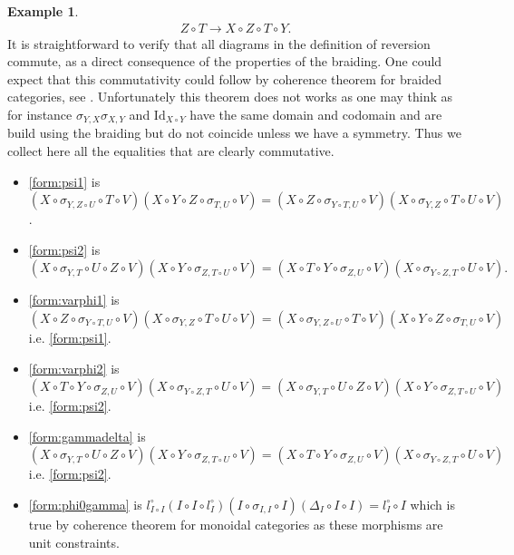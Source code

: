 \documentclass[nosumlimits,twoside]{amsart}
\theoremstyle{definition}
\newtheorem{example}[example]{\sc Example}
\theoremstyle{remark}
\newenvironment{invisible}{{\noindent\sc \colorbox{yellow}{Invisible:}\;}\color{gray}}{\medskip}
\newcommand{\id}{\mathrm{Id}}
\begin{document}
\begin{example}
\begin{eqnarray*}
Z\circ T\rightarrow X\circ Z\circ T\circ Y.
\end{eqnarray*}%
It is straightforward to verify that all diagrams in the definition of reversion commute, as a direct consequence of the properties of the braiding. \begin{invisible}
One could expect that this commutativity could follow by coherence theorem for braided categories, see \cite[Theorem 2.5]{Joyal-Street}. Unfortunately this theorem does not works as one may think as for instance $\sigma_{Y,X}\sigma_{X,Y}$ and $\id_{X\circ Y}$ have the same domain and codomain and are build using the braiding but do not coincide unless we have a symmetry. Thus we collect here all the equalities that are clearly commutative.
\begin{itemize}
\item \eqref{form:psi1} is $\left( X\circ \sigma _{Y,Z\circ U}\circ T\circ
V\right) \left( X\circ Y\circ Z\circ \sigma _{T,U}\circ V\right) =\left(
X\circ Z\circ \sigma _{Y\circ T,U}\circ V\right) \left( X\circ \sigma
_{Y,Z}\circ T\circ U\circ V\right) $.

\item \eqref{form:psi2} is $\left( X\circ \sigma _{Y,T}\circ U\circ Z\circ
V\right) \left( X\circ Y\circ \sigma _{Z,T\circ U}\circ V\right) =\left(
X\circ T\circ Y\circ \sigma _{Z,U}\circ V\right) \left( X\circ \sigma
_{Y\circ Z,T}\circ U\circ V\right) .$

\item \eqref{form:varphi1} is $\left( X\circ Z\circ \sigma _{Y\circ T,U}\circ
V\right) \left( X\circ \sigma _{Y,Z}\circ T\circ U\circ V\right) =\left(
X\circ \sigma _{Y,Z\circ U}\circ T\circ V\right) \left( X\circ Y\circ Z\circ
\sigma _{T,U}\circ V\right) $ i.e. \eqref{form:psi1}.

\item \eqref{form:varphi2} is $\left( X\circ T\circ Y\circ \sigma _{Z,U}\circ
V\right) \left( X\circ \sigma _{Y\circ Z,T}\circ U\circ V\right) =\left(
X\circ \sigma _{Y,T}\circ U\circ Z\circ V\right) \left( X\circ Y\circ \sigma
_{Z,T\circ U}\circ V\right) $ i.e. \eqref{form:psi2}.

\item \eqref{form:gammadelta} is $\left( X\circ \sigma _{Y,T}\circ U\circ
Z\circ V\right) \left( X\circ Y\circ \sigma _{Z,T\circ U}\circ V\right)
=\left( X\circ T\circ Y\circ \sigma _{Z,U}\circ V\right) \left( X\circ
\sigma _{Y\circ Z,T}\circ U\circ V\right) $ i.e. \eqref{form:psi2}.

\item \eqref{form:phi0gamma} is $l_{I\circ I}^{\circ }\left( I\circ I\circ
l_{I}^{\circ }\right) \left( I\circ \sigma _{I,I}\circ I\right) \left(
\Delta _{I}\circ I\circ I\right) =l_{I}^{\circ }\circ I$ which is true by
coherence theorem for monoidal categories as these morphisms are unit
constraints.


\end{itemize}
\end{invisible}
\end{example}
\end{document}
